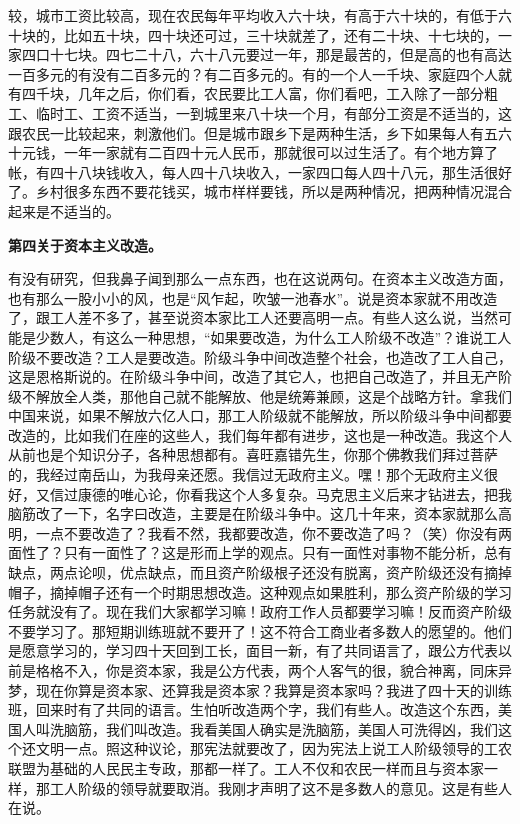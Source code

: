 较，城市工资比较高，现在农民每年平均收入六十块，有高于六十块的，有低于六十块的，比如五十块，四十块还可过，三十块就差了，还有二十块、十七块的，一家四口十七块。四七二十八，六十八元要过一年，那是最苦的，但是高的也有高达一百多元的有没有二百多元的？有二百多元的。有的一个人一千块、家庭四个人就有四千块，几年之后，你们看，农民要比工人富，你们看吧，工入除了一部分粗工、临时工、工资不适当，一到城里来八十块一个月，有部分工资是不适当的，这跟农民一比较起来，刺激他们。但是城市跟乡下是两种生活，乡下如果每人有五六十元钱，一年一家就有二百四十元人民币，那就很可以过生活了。有个地方算了帐，有四十八块钱收入，每人四十八块收入，一家四口每人四十八元，那生活很好了。乡村很多东西不要花钱买，城市样样要钱，所以是两种情况，把两种情况混合起来是不适当的。

\textbf{第四关于资本主义改造。}

有没有研究，但我鼻子闻到那么一点东西，也在这说两句。在资本主义改造方面，也有那么一股小小的风，也是“风乍起，吹皱一池春水”。说是资本家就不用改造了，跟工人差不多了，甚至说资本家比工人还要高明一点。有些人这么说，当然可能是少数人，有这么一种思想，“如果要改造，为什么工人阶级不改造”？谁说工人阶级不要改造？工人是要改造。阶级斗争中间改造整个社会，也造改了工人自己，这是恩格斯说的。在阶级斗争中间，改造了其它人，也把自己改造了，并且无产阶级不解放全人类，那他自己就不能解放、他是统筹兼顾，这是个战略方针。拿我们中国来说，如果不解放六亿人口，那工人阶级就不能解放，所以阶级斗争中间都要改造的，比如我们在座的这些人，我们每年都有进步，这也是一种改造。我这个人从前也是个知识分子，各种思想都有。喜旺嘉错先生，你那个佛教我们拜过菩萨的，我经过南岳山，为我母亲还愿。我信过无政府主义。嘿！那个无政府主义很好，又信过康德的唯心论，你看我这个人多复杂。马克思主义后来才钻进去，把我脑筋改了一下，名字曰改造，主要是在阶级斗争中。这几十年来，资本家就那么高明，一点不要改造了？我看不然，我都要改造，你不要改造了吗？（笑）你没有两面性了？只有一面性了？这是形而上学的观点。只有一面性对事物不能分析，总有缺点，两点论呗，优点缺点，而且资产阶级根子还没有脱离，资产阶级还没有摘掉帽子，摘掉帽子还有一个时期思想改造。这种观点如果胜利，那么资产阶级的学习任务就没有了。现在我们大家都学习嘛！政府工作人员都要学习嘛！反而资产阶级不要学习了。那短期训练班就不要开了！这不符合工商业者多数人的愿望的。他们是愿意学习的，学习四十天回到工长，面目一新，有了共同语言了，跟公方代表以前是格格不入，你是资本家，我是公方代表，两个人客气的很，貌合神离，同床异梦，现在你算是资本家、还算我是资本家？我算是资本家吗？我进了四十天的训练班，回来时有了共同的语言。生怕听改造两个字，我们有些人。改造这个东西，美国人叫洗脑筋，我们叫改造。我看美国人确实是洗脑筋，美国人可洗得凶，我们这个还文明一点。照这种议论，那宪法就要改了，因为宪法上说工人阶级领导的工农联盟为基础的人民民主专政，那都一样了。工人不仅和农民一样而且与资本家一样，那工人阶级的领导就要取消。我刚才声明了这不是多数人的意见。这是有些人在说。

